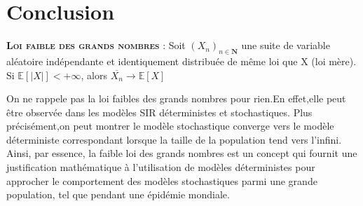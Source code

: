 \chapter{Conclusion}

\textsc{\bf Loi faible des grands nombres} : Soit $(X_n)_{n \in \boldsymbol{N}}$ une suite de variable aléatoire indépendante et identiquement distribuée de même loi que X (loi mère). Si $\mathbb{E}[|X|] < +\infty$, alors $\overline{X_n} \rightarrow \mathbb{E}[X]$

On ne rappele pas la loi faibles des grands nombres pour rien.En effet,elle peut être observée dans les modèles SIR déterministes et stochastiques. Plus précisément,on peut montrer le modèle stochastique converge vers le modèle déterministe correspondant lorsque la taille de la population tend vers l'infini. Ainsi, par essence, la faible loi des grands nombres est un concept qui fournit une justification mathématique à l'utilisation de modèles déterministes pour approcher le comportement des modèles stochastiques parmi une grande population, tel que pendant une épidémie mondiale.

